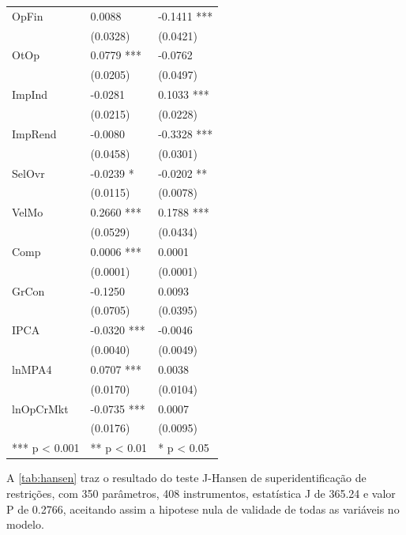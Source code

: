 \documentclass[
  12pt,
  12pt,
  openright,
  oneside,
  a4paper,
  chapter=TITLE,
  section=TITLE,
  subsection=TITLE,
  subsubsection=TITLE,
  english,
  portugues,
  sumario=tradicional]{abntex2}
\begin{document}
\begin{longtable}[]{@{}lll@{}}
OpFin & 0.0088 & -0.1411 *** \\
& (0.0328) & (0.0421) \\
OtOp & 0.0779 *** & -0.0762 \\
& (0.0205) & (0.0497) \\
ImpInd & -0.0281 & 0.1033 *** \\
& (0.0215) & (0.0228) \\
ImpRend & -0.0080 & -0.3328 *** \\
& (0.0458) & (0.0301) \\
SelOvr & -0.0239 * & -0.0202 ** \\
& (0.0115) & (0.0078) \\
VelMo & 0.2660 *** & 0.1788 *** \\
& (0.0529) & (0.0434) \\
Comp & 0.0006 *** & 0.0001 \\
& (0.0001) & (0.0001) \\
GrCon & -0.1250 & 0.0093 \\
& (0.0705) & (0.0395) \\
IPCA & -0.0320 *** & -0.0046 \\
& (0.0040) & (0.0049) \\
lnMPA4 & 0.0707 *** & 0.0038 \\
& (0.0170) & (0.0104) \\
lnOpCrMkt & -0.0735 *** & 0.0007 \\
& (0.0176) & (0.0095) \\
*** p \textless{} 0.001 & ** p \textless{} 0.01 & * p \textless{} 0.05 \\
\bottomrule
\end{longtable}

\vspace{1mm}

\label{tb:pvargmm}
\vspace{-2mm}
\vspace{20pt}

\parindent 1.50cm

\vspace{20pt}

A \autoref{tab:hansen} traz o resultado do teste J-Hansen de superidentificação de restrições, com 350 parâmetros, 408 instrumentos, estatística J de 365.24 e valor P de 0.2766, aceitando assim a hipotese nula de validade de todas as variáveis no modelo.
\end{document}
